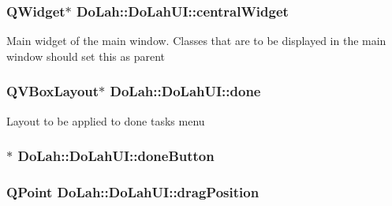 \subsubsection[{central\+Widget}]{\setlength{\rightskip}{0pt plus 5cm}Q\+Widget$\ast$ Do\+Lah\+::\+Do\+Lah\+U\+I\+::central\+Widget}\label{class_do_lah_1_1_do_lah_u_i_a2fa44a7efc6fb05e91c81cee35c875a8}
Main widget of the main window. Classes that are to be displayed in the main window should set this as parent \hypertarget{class_do_lah_1_1_do_lah_u_i_a54adac752c5152aed15659a0d9879201}{}
\subsubsection[{done}]{\setlength{\rightskip}{0pt plus 5cm}Q\+V\+Box\+Layout$\ast$ Do\+Lah\+::\+Do\+Lah\+U\+I\+::done}\label{class_do_lah_1_1_do_lah_u_i_a54adac752c5152aed15659a0d9879201}
Layout to be applied to done tasks menu \hypertarget{class_do_lah_1_1_do_lah_u_i_a667668be28f14830fa6e53ea44324a16}{}
\subsubsection[{done\+Button}]{$\ast$ Do\+Lah\+::\+Do\+Lah\+U\+I\+::done\+Button}\label{class_do_lah_1_1_do_lah_u_i_a667668be28f14830fa6e53ea44324a16}
\hypertarget{class_do_lah_1_1_do_lah_u_i_a81fd0c67d9f3a2050163841482203b4a}{}
\subsubsection[{drag\+Position}]{\setlength{\rightskip}{0pt plus 5cm}Q\+Point Do\+Lah\+::\+Do\+Lah\+U\+I\+::drag\+Position\hspace{0.3cm}{\ttfamily [private]}}\label{class_do_lah_1_1_do_lah_u_i_a81fd0c67d9f3a2050163841482203b4a}
\hypertarget{class_do_lah_1_1_do_lah_u_i_a1a8e7f6fc6115438b29e0458530c0818}{}
